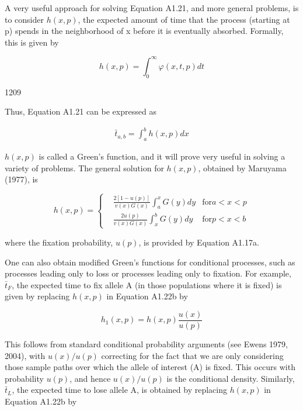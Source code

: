 \documentclass{article}
\begin{document}
A very useful approach for solving Equation A1.21, and more general problems, is to consider  $ h(x,p) $, the expected amount of time that the process (starting at p) spends in the neighborhood of x before it is eventually absorbed. Formally, this is given by

\begin{equation}
h(x,p)=\int_{0}^{\infty}\varphi(x,t,p)dt
\end{equation}

1209

Thus, Equation A1.21 can be expressed as

\begin{equation}
\begin{align*}\bar t_{a,b}=\int_a^b h(x,p)dx\end{align*}
\end{equation}

 $ h(x,p) $ is called a Green's function, and it will prove very useful in solving a variety of problems. The general solution for  $ h(x,p) $, obtained by Maruyama (1977), is

\begin{equation}
h(x,p)=\left\{\begin{aligned}&\frac{2[1-u(p)]}{v(x)G(x)}\int_{a}^{x}G(y)dy&\text{for}a<x<p\\ &\frac{2u(p)}{v(x)G(x)}\int_{x}^{b}G(y)dy&\text{for}p<x<b\end{aligned}\right.
\end{equation}

where the fixation probability,  $ u(p) $, is provided by Equation A1.17a.

One can also obtain modified Green’s functions for conditional processes, such as processes leading only to loss or processes leading only to fixation. For example,  $ \bar{t}_{F} $, the expected time to fix allele A (in those populations where it is fixed) is given by replacing  $ h(x,p) $ in Equation A1.22b by

\begin{equation}
h_{1}(x,p)=h(x,p)\frac{u(x)}{u(p)}
\end{equation}

This follows from standard conditional probability arguments (see Ewens 1979, 2004), with  $ u(x)/u(p) $ correcting for the fact that we are only considering those sample paths over which the allele of interest (A) is fixed. This occurs with probability  $ u(p) $, and hence  $ u(x)/u(p) $ is the conditional density. Similarly,  $ \bar{t}_{L} $, the expected time to lose allele A, is obtained by replacing  $ h(x,p) $ in Equation A1.22b by
\end{document}
